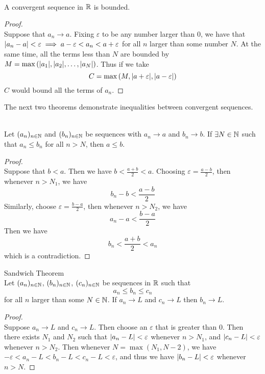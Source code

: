 \documentclass[a4paper]{article}
\begin{document}
\begin{prp}{}{}\\ A convergent sequence in $\mathbb{R}$ is bounded. 
\begin{proof}\\ Suppose that $a_n\to a$. Fixing $\varepsilon$ to be any number larger than 0, we have that $\abs{a_n-a}<\varepsilon\implies a-\varepsilon<a_n<a+\varepsilon$ for all $n$ larger than some number $N$. At the same time, all the terms less than $N$ are bounded by $M=\max{(\abs{a_1}, \abs{a_2}, \dots,\abs{a_N})}$. Thus if we take $$C=\max{(M,\abs{a+\varepsilon},\abs{a-\varepsilon})}$$ $C$ would bound all the terms of $a_n$. 
\end{proof}
\end{prp}

The next two theorems demonstrate inequalities between convergent sequences. 

\begin{prp}{}{}\\ Let $(a_n)_{n\in\mathbb{N}}$ and $(b_n)_{n\in\mathbb{N}}$ be sequences with $a_n\to a$ and $b_n\to b$. If $\exists N\in\mathbb{N}$ such that $a_n\leq b_n$ for all $n>N$, then $a\leq b$. 
\begin{proof}\\ Suppose that $b<a$. Then we have $b<\frac{a+b}{2}<a$. Choosing $\varepsilon=\frac{a-b}{2}$, then whenever $n>N_1$, we have $$b_n-b<\frac{a-b}{2}$$ Similarly, choose $\varepsilon=\frac{b-a}{2}$, then whenever $n>N_2$, we have $$a_n-a<\frac{b-a}{2}$$ Then we have $$b_n<\frac{a+b}{2}<a_n$$ which is a contradiction. 
\end{proof}
\end{prp}

\begin{prp}{Sandwich Theorem}{}\\ Let $(a_n)_{n\in\mathbb{N}}$, $(b_n)_{n\in\mathbb{N}}$, $(c_n)_{n\in\mathbb{N}}$ be sequences in $\mathbb{R}$ such that $$a_n\leq b_n\leq c_n$$ for all $n$ larger than some $N\in\mathbb{N}$. If $a_n\to L$ and $c_n\to L$ then $b_n\to L$. 
\begin{proof}\\ Suppose $a_n\to L$ and $c_n\to L$. Then choose an $\varepsilon$ that is greater than $0$. Then there exists $N_1$ and $N_2$ such that $\abs{a_n-L}<\varepsilon$ whenever $n>N_1$, and $\abs{c_n-L}<\varepsilon$ whenever $n>N_2$. Then whenever $N=\max{(N_1,N-2)}$, we have $-\varepsilon<a_n-L<b_n-L<c_n-L<\varepsilon$, and thus we have $\abs{b_n-L}<\varepsilon$ whenever $n>N$. 
\end{proof}
\end{prp}
\end{document}
